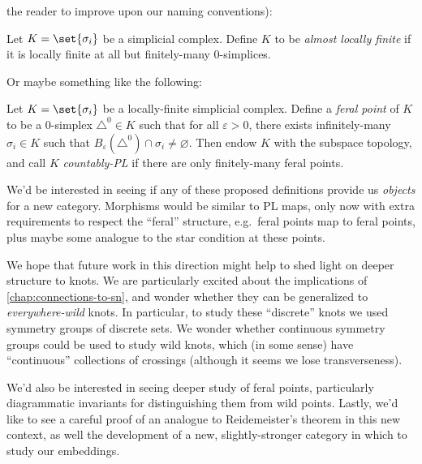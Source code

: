 the reader to improve upon our naming conventions):
\begin{definition}
  Let $K = \set{\sigma_i}$ be a simplicial complex. Define $K$ to be
  \emph{almost locally finite} if it is locally finite at all but
  finitely-many $0$-simplices.
\end{definition}
Or maybe something like the following:
\begin{definition}
  Let $K = \set{\sigma_i}$ be a locally-finite simplicial complex.
  Define a \emph{feral point} of $K$ to be a $0$-simplex $\triangle^0
  \in K$ such that for all $\varepsilon > 0$, there exists
  infinitely-many $\sigma_i \in K$ such that
  $B_\varepsilon(\triangle^0) \cap \sigma_i \neq \varnothing$. Then
  endow $K$ with the subspace topology, and call $K$
  \emph{countably-PL} if there are only finitely-many feral points.
\end{definition}
We'd be interested in seeing if any of these proposed definitions
provide us \emph{objects} for a new category. Morphisms would be
similar to PL maps, only now with extra requirements to respect the
``feral'' structure, e.g.\ feral points map to feral points, plus
maybe some analogue to the star condition at these points.

We hope that future work in this direction might help to shed light on
deeper structure to knots. We are particularly excited about the
implications of \cref{chap:connections-to-sn}, and wonder whether they
can be generalized to \emph{everywhere-wild} knots. In particular, to
study these ``discrete'' knots we used symmetry groups of discrete
sets. We wonder whether continuous symmetry groups could be used to
study wild knots, which (in some sense) have ``continuous''
collections of crossings (although it seems we lose transverseness).

We'd also be interested in seeing deeper study of feral points,
particularly diagrammatic invariants for distinguishing them from wild
points. Lastly, we'd like to see a careful proof of an analogue to
Reidemeister's theorem in this new context, as well the development of
a new, slightly-stronger category in which to study our embeddings.







